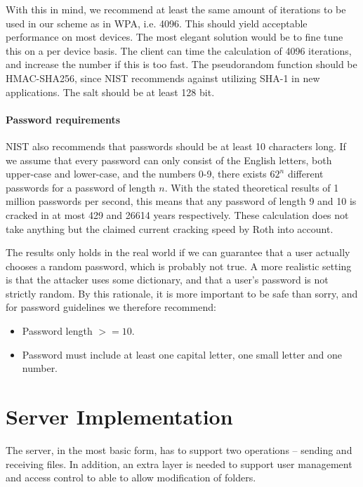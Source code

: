 \documentclass[pdftex,english,10pt,b5paper,twoside]{book}
\begin{document}
With this in mind, we recommend at least the same amount of iterations to be
used in our scheme as in \ac{WPA}, i.e. 4096. This should yield acceptable
performance on most devices. The most elegant solution would be to fine tune
this on a per device basis. The client can time the calculation of 4096
iterations, and increase the number if this is too fast. The pseudorandom
function should be \ac{HMAC}-\ac{SHA}256, since \ac{NIST} recommends against
utilizing \ac{SHA}-1 in new applications. The salt should be at least 128 bit.

\paragraph{Password requirements}

\ac{NIST} also recommends that passwords should be at least 10 characters long.
If we assume that every password can only consist of the English letters, both
upper-case and lower-case, and the numbers 0-9, there exists $62^n$ different
passwords for a password of length $n$. With the stated theoretical results of
1 million passwords per second, this means that any password of length 9 and 10
is cracked in at most 429 and 26614 years respectively. These calculation does
not take anything but the claimed current cracking speed by Roth into account.

The results only holds in the real world if we can guarantee that a user
actually chooses a random password, which is probably not true. A more
realistic setting is that the attacker uses some dictionary, and that a user's
password is not strictly random. By this rationale, it is more important to be
safe than sorry, and for password guidelines we therefore recommend:

\begin{itemize}
\item Password length $>= 10$.
\item Password must include at least one capital letter, one small letter and
one number.
\end{itemize}

\section{Server Implementation}

The server, in the most basic form, has to support two operations -- sending
and receiving files. In addition, an extra layer is needed to support user
management and access control to able to allow modification of folders.
\end{document}
